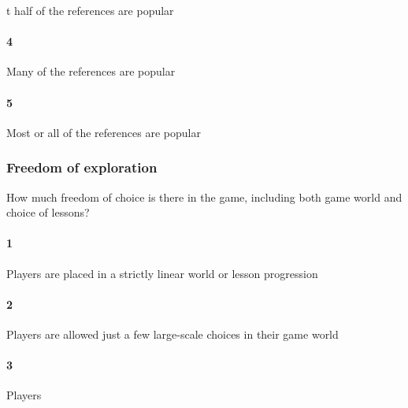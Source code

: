 t half of the references are popular\paragraph{4}Many of the references are popular\paragraph{5}Most or all of the references are popular\subsubsection{Freedom of exploration}How much freedom of choice is there in the game, including both game world and choice of lessons?\paragraph{1}Players are placed in a strictly linear world or lesson progression\paragraph{2}Players are allowed just a few large-scale choices in their game world\paragraph{3}Players 